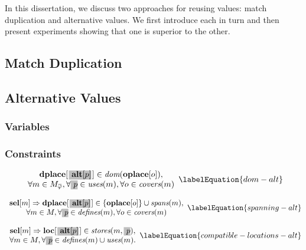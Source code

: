 In this dissertation, we discuss two approaches for reusing values: \gls{match
  duplication} and \glspl{alternative value}.
%
We first introduce each in turn and then present experiments showing that one is
superior to the other.


\subsection{Match Duplication}



\subsection{Alternative Values}


\subsubsection{Variables}


\subsubsection{Constraints}


\begin{equation}
  \begin{array}{c}
    \mVar{dplace}[\hlDiff{\mVar{alt}[p]}[1pt]] \in \mDom(\mVar{oplace}[o]), \\
    \forall m \in \mMatchCompSet{\mPhi},
    \forall \hlDiff{p} \in \mUses(m),
    \forall o \in \mCovers(m)
  \end{array}
  \labelEquation{dom-alt}
\end{equation}

\begin{equation}
  \begin{array}{c}
    \mVar{sel}[m]
    \mImp
    \mVar{dplace}[\hlDiff{\mVar{alt}[p]}[1pt]] \in
      \mSet{\mVar{oplace}[o]} \cup \mSpans(m), \\
    \forall m \in \mMatchSet,
    \forall \hlDiff{p} \in \mDefines(m),
    \forall o \in \mCovers(m)
  \end{array}
  \labelEquation{spanning-alt}
\end{equation}

\begin{equation}
  \begin{array}{c}
    \mVar{sel}[m]
    \mImp
    \mVar{loc}[\hlDiff{\mVar{alt}[p]}[1pt]] \in \mStores(m, \hlDiff{p}), \\
    \forall m \in \mMatchSet,
    \forall \hlDiff{p} \in \mDefines(m) \cup \mUses(m).
  \end{array}
  \labelEquation{compatible-locations-alt}
\end{equation}

